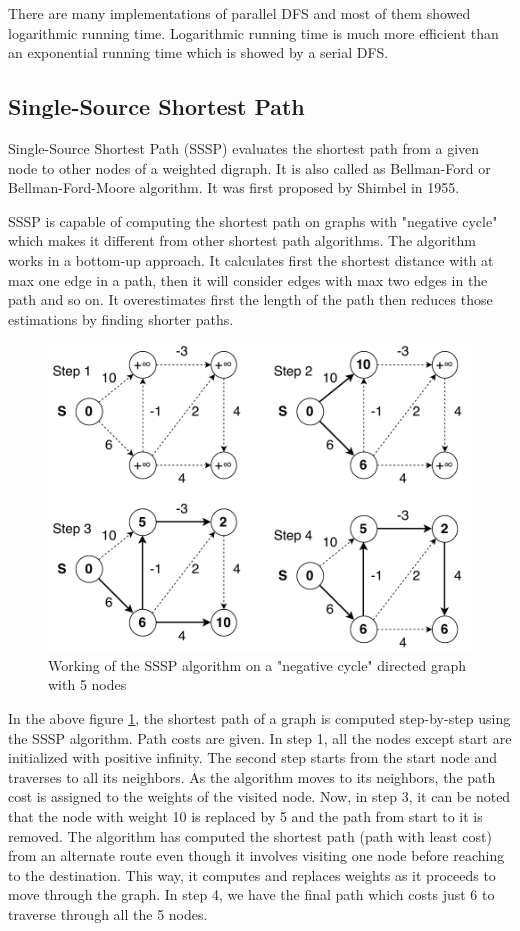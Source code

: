 \documentclass[journal,twoside,web]{ieeecolor}
\begin{document}
There are many implementations of parallel DFS and most of them showed logarithmic running time\cite{38}. Logarithmic running time is much more efficient than an exponential running time which is showed by a serial DFS.

\subsection{Single-Source Shortest Path}
Single-Source Shortest Path (SSSP) evaluates the shortest path from a given node to other nodes of a weighted digraph. It is also called as Bellman-Ford or Bellman-Ford-Moore algorithm\cite{41}. It was first proposed by Shimbel\cite{42} in 1955.

SSSP is capable of computing the shortest path on graphs with "negative cycle" which makes it different from other shortest path algorithms. The algorithm works in a bottom-up approach. It calculates first the shortest distance with at max one edge in a path, then it will consider edges with max two edges in the path and so on. It overestimates first the length of the path then reduces those estimations by finding shorter paths. 

\begin{figure}[!h]
    \centerline{\includegraphics[scale=0.55]{figures/sssp.pdf}}
    \caption{Working of the SSSP algorithm on a "negative cycle" directed graph with 5 nodes}
    \label{fig2}
\end{figure}

In the above figure \ref{fig2}, the shortest path of a graph is computed step-by-step using the SSSP algorithm. Path costs are given. In step 1, all the nodes except start are initialized with positive infinity. The second step starts from the start node and traverses to all its neighbors. As the algorithm moves to its neighbors, the path cost is assigned to the weights of the visited node. Now, in step 3, it can be noted that the node with weight 10 is replaced by 5 and the path from start to it is removed. The algorithm has computed the shortest path (path with least cost) from an alternate route even though it involves visiting one node before reaching to the destination. This way, it computes and replaces weights as it proceeds to move through the graph. In step 4, we have the final path which costs just 6 to traverse through all the 5 nodes.
\end{document}
